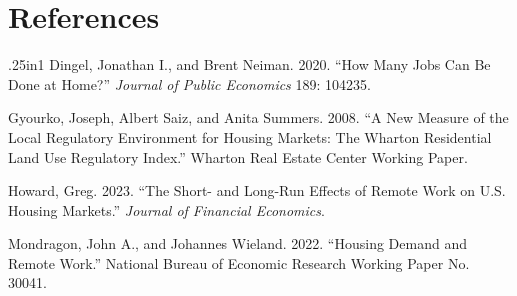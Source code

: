 \documentclass[11pt]{article}
\begin{document}
\section*{References}
\begin{hangparas}{.25in}{1}
Dingel, Jonathan I., and Brent Neiman. 2020. ``How Many Jobs Can Be Done at Home?'' \textit{Journal of Public Economics} 189: 104235.

Gyourko, Joseph, Albert Saiz, and Anita Summers. 2008. ``A New Measure of the Local Regulatory Environment for Housing Markets: The Wharton Residential Land Use Regulatory Index.'' Wharton Real Estate Center Working Paper.

Howard, Greg. 2023. ``The Short- and Long-Run Effects of Remote Work on U.S. Housing Markets.'' \textit{Journal of Financial Economics}.

Mondragon, John A., and Johannes Wieland. 2022. ``Housing Demand and Remote Work.'' National Bureau of Economic Research Working Paper No. 30041.
\end{hangparas}
\end{document}

